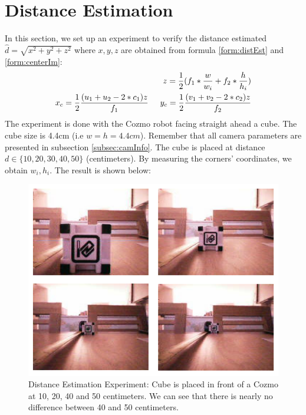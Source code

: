\section{Distance Estimation}
In this section, we set up an experiment to verify the distance estimated $\hat{d} = \sqrt{x^2 + y^2 + z^2}$ where $x, y, z$ are obtained from formula \ref{form:distEst} and \ref{form:centerIm}:
\begin{align*}
	z = \frac{1}{2} (f_1 * \frac{w}{w_i} + f_2 * \frac{h}{h_i}) \\
	x_c = \frac{1}{2}\frac{(u_1 + u_2 - 2 * c_1)z}{f_1} \hspace{0.5cm} y_c = \frac{1}{2}\frac{(v_1 + v_2 - 2*c_2)z}{f_2}
\end{align*}
The experiment is done with the Cozmo robot facing straight ahead a cube. The cube size is 4.4cm (i.e $w = h = 4.4cm$). Remember that all camera parameters are presented in subsection \ref{subsec:camInfo}. The cube is placed at distance $d \in \{10, 20, 30, 40, 50\}$ (centimeters). By measuring the corners' coordinates, we obtain $w_i, h_i$. The result is shown below:

\begin{figure}[tb]
	\centering
	\includegraphics[width=0.6\hsize]{./figures/distEstim}
	\caption{Distance Estimation Experiment: Cube is placed in front of a Cozmo at 10, 20, 40 and 50 centimeters. We can see that there is nearly no difference between 40 and 50 centimeters.}
	\label{fig:distEstim}
\end{figure}
